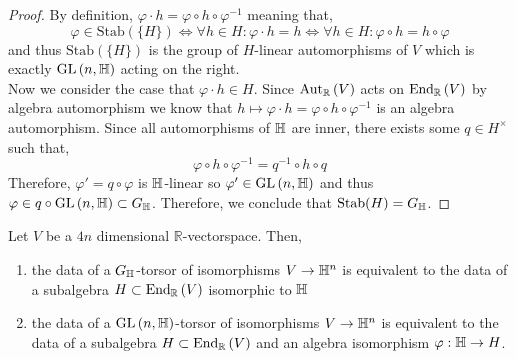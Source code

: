 \documentclass[12pt]{extarticle}
\newcommand{\R}{\mathbb{R}}
\begin{document}
\begin{proof}
By definition, $\varphi \cdot h = \varphi \circ h \circ \varphi^{-1}$ meaning that,
\[ \varphi \in \mathrm{Stab}(\{ H \}) \iff \forall h  \in H : \varphi \cdot h = h \iff \forall h \in H : \varphi \circ h = h \circ \varphi \]
and thus $\mathrm{Stab}(\{ H \})$ is the group of $H$-linear automorphisms of $V$ which is exactly $\mathrm{GL}\left(n, \mathbb{H} \right)$ acting on the right.
\bigskip\\
Now we consider the case that $\varphi \cdot h \in H$. Since $\Aut{\R}{V}$ acts on $\End{\R}{V}$ by algebra automorphism we know that $h \mapsto \varphi \cdot h = \varphi \circ h \circ \varphi^{-1}$ is an algebra automorphism. Since all automorphisms of $\mathbb{H}$ are inner, there exists some $q \in H^\times$ such that,
\[ \varphi \circ h \circ \varphi^{-1} = q^{-1} \circ h \circ q \]
Therefore, $\varphi' = q \circ \varphi$ is $\mathbb{H}$-linear so $\varphi' \in \mathrm{GL}\left(n, \mathbb{H} \right)$ and thus $\varphi \in q \circ \mathrm{GL}\left(n, \mathbb{H} \right) \subset G_{\mathbb{H}}$. Therefore, we conclude that $\mathrm{Stab}(H) = G_{\mathbb{H}}$.
\end{proof}

\begin{prop}
Let $V$ be a $4n$ dimensional $\R$-vectorspace. Then,
\begin{enumerate}
\item the data of a $G_{\mathbb{H}}$-torsor of isomorphisms $V \to \mathbb{H}^n$ is equivalent to the data of a subalgebra $H \subset \End{\R}{V}$ isomorphic to $\mathbb{H}$
\item the data of a $\mathrm{GL}\left(n, \mathbb{H} \right)$-torsor of isomorphisms $V \to \mathbb{H}^n$ is equivalent to the data of a subalgebra $H \subset \End{\R}{V}$ and an algebra isomorphism $\varphi : \mathbb{H} \to H$.
\end{enumerate}
\end{prop}
\end{document}
